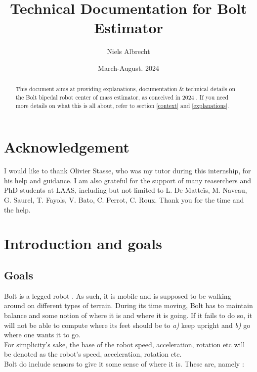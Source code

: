 \documentclass[a4paper,10pt]{article}
\title{Technical Documentation for Bolt Estimator}
\date{March-August. 2024}
\author{Niels Albrecht}
\begin{document}
\maketitle

\begin{abstract}
This document aims at providing explanations, documentation \& technical details on the Bolt bipedal robot center of mass estimator, as conceived in 2024 \cite{Git_NAlbrecht}. If you need more details on what this is all about, refer to section \ref{context} and \ref{explanations}.

\end{abstract}

\newpage
\tableofcontents
\newpage


\section*{Acknowledgement}

I would like to thank Olivier Stasse, who was my tutor during this internship, for his help and guidance. I am also grateful for the support of many reaserchers and PhD students at LAAS, including but not limited to L. De Matteïs, M. Naveau, G. Saurel, T. Fayols, V. Bato, C. Perrot, C. Roux. Thank you for the time and the help.

\clearpage








\section{Introduction and goals}
\subsection{Goals}
Bolt is a legged robot \cite{Git_hardware_bolt} \cite{Git_OStasse}. As such, it is mobile and is supposed to be walking around on different types of terrain. During its time moving, Bolt has to maintain balance and some notion of where it is and where it is going. If it fails to do so, it will not be able to compute where its feet should be to \textit{a)} keep upright and \textit{b)} go where one wants it to go.\\
For simplicity's sake, the base of the robot speed, acceleration, rotation etc will be denoted as the robot's speed, acceleration, rotation etc.\\
Bolt do include sensors to give it some sense of where it is. These are, namely :
\end{document}
